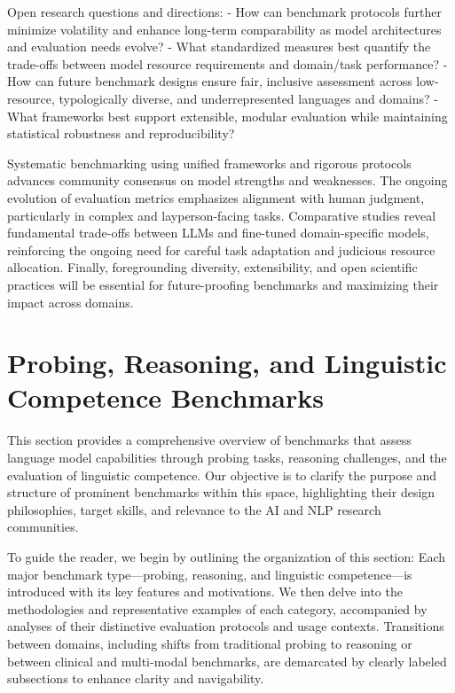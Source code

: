 \documentclass[sigconf]{acmart}
\begin{document}
Open research questions and directions:
- How can benchmark protocols further minimize volatility and enhance long-term comparability as model architectures and evaluation needs evolve?
- What standardized measures best quantify the trade-offs between model resource requirements and domain/task performance?
- How can future benchmark designs ensure fair, inclusive assessment across low-resource, typologically diverse, and underrepresented languages and domains?
- What frameworks best support extensible, modular evaluation while maintaining statistical robustness and reproducibility?

Systematic benchmarking using unified frameworks and rigorous protocols advances community consensus on model strengths and weaknesses. The ongoing evolution of evaluation metrics emphasizes alignment with human judgment, particularly in complex and layperson-facing tasks. Comparative studies reveal fundamental trade-offs between LLMs and fine-tuned domain-specific models, reinforcing the ongoing need for careful task adaptation and judicious resource allocation. Finally, foregrounding diversity, extensibility, and open scientific practices will be essential for future-proofing benchmarks and maximizing their impact across domains.

\section{Probing, Reasoning, and Linguistic Competence Benchmarks}

This section provides a comprehensive overview of benchmarks that assess language model capabilities through probing tasks, reasoning challenges, and the evaluation of linguistic competence. Our objective is to clarify the purpose and structure of prominent benchmarks within this space, highlighting their design philosophies, target skills, and relevance to the AI and NLP research communities. 

To guide the reader, we begin by outlining the organization of this section: Each major benchmark type—probing, reasoning, and linguistic competence—is introduced with its key features and motivations. We then delve into the methodologies and representative examples of each category, accompanied by analyses of their distinctive evaluation protocols and usage contexts. Transitions between domains, including shifts from traditional probing to reasoning or between clinical and multi-modal benchmarks, are demarcated by clearly labeled subsections to enhance clarity and navigability.
\end{document}
